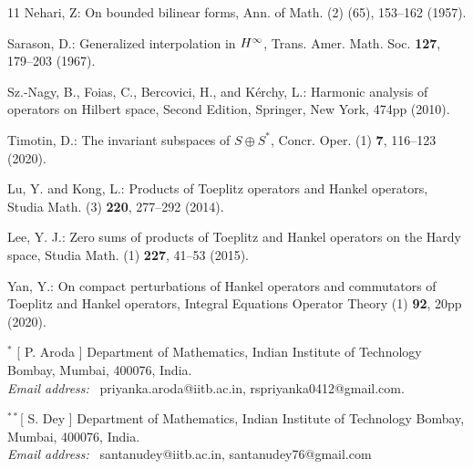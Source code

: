 \documentclass[12pt, reqno]{amsart}
\theoremstyle{definition}
\theoremstyle{remark}
\numberwithin{equation}{section}
\begin{document}
\begin{thebibliography}{11}
        Nehari, Z: {On bounded bilinear forms}, Ann. of Math. (2) (65), 153--162 (1957).

        Sarason, D.: {Generalized interpolation in {$H\sp{\infty }$}}, Trans. Amer. Math. Soc. {\bf127}, 179--203 (1967).
        
        Sz.-Nagy, B., Foias, C., Bercovici, H., and K\'erchy, L.: {Harmonic analysis of operators on {H}ilbert space}, {Second Edition}, {Springer, New York}, 474pp (2010).

        Timotin, D.: {The invariant subspaces of {$S\oplus S^*$}}, Concr. Oper. (1) {\bf 7},
        116--123 (2020).

        Lu, Y. and Kong, L.: {Products of {T}oeplitz operators and {H}ankel operators}, Studia Math. (3) {\bf 220}, 277--292 (2014).

        Lee, Y. J.: {Zero sums of products of {T}oeplitz and {H}ankel operators on the {H}ardy space}, Studia Math. (1) {\bf 227}, 41--53 (2015).

        Yan, Y.: {On compact perturbations of {H}ankel operators and commutators of {T}oeplitz and {H}ankel operators}, Integral Equations Operator Theory (1) {\bf 92}, 20pp (2020).

    \end{thebibliography}

   \noindent $^{*}$ [ P. Aroda ] Department of Mathematics, Indian Institute of Technology Bombay, Mumbai, 400076, India.\\
		\textit{Email address:}~ priyanka.aroda@iitb.ac.in, rspriyanka0412@gmail.com.
        
	\noindent $^{**}$[ S. Dey ] Department of Mathematics, Indian Institute of Technology Bombay, Mumbai, 400076, India.\\
        \textit{Email address:}~ santanudey@iitb.ac.in, santanudey76@gmail.com
\end{document}

